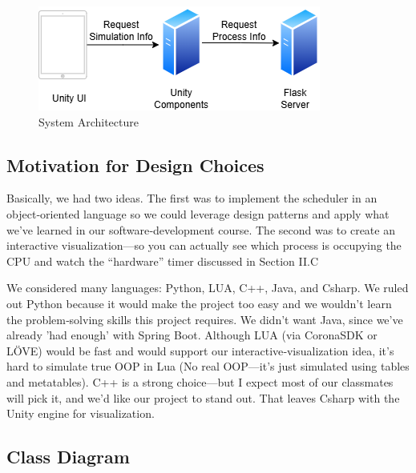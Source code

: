 \documentclass[conference]{IEEEtran}
\begin{document}
\begin{figure}[H]
    \centering
    \includegraphics[width=0.8\linewidth]{apah.png}
    \caption{System Architecture}
    \label{fig:architecture}
\end{figure}


\subsection{Motivation for Design Choices}
Basically, we had two ideas. The first was to implement the scheduler in an object‑oriented language so we could leverage design patterns and apply what we’ve learned in our software‑development course. The second was to create an interactive visualization—so you can actually see which process is occupying the CPU and watch the “hardware” timer discussed in Section II.C

We considered many languages: Python, LUA, C++, Java, and Csharp. We ruled out Python because it would make the project too easy and we wouldn’t learn the problem‑solving skills this project requires. We didn’t want Java, since we’ve already 'had enough' with Spring Boot. Although LUA (via CoronaSDK or LÖVE) would be fast and would support our interactive‑visualization idea, it’s hard to simulate true OOP in Lua (No real OOP—it’s just simulated using tables and metatables). C++ is a strong choice—but I expect most of our classmates will pick it, and we’d like our project to stand out. That leaves Csharp with the Unity engine for visualization.

\subsection{Class Diagram}
\end{document}
